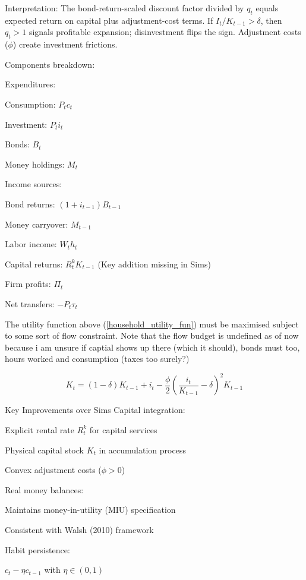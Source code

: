 \documentclass[11pt,preprint]{elsarticle}
\numberwithin{equation}{section}
\numberwithin{figure}{section}
\numberwithin{table}{section}
\begin{document}
Interpretation: The bond-return-scaled discount factor divided by
\(q_t\) equals expected return on capital plus adjustment-cost terms. If
\(I_t/K_{t-1}>\delta\), then \(q_t>1\) signals profitable expansion;
disinvestment flips the sign. Adjustment costs (\(\phi\)) create
investment frictions.

\newpage

\newpage

Components breakdown:

Expenditures:

Consumption: \(P_t c_t\)

Investment: \(P_t i_t\)

Bonds: \(B_t\)

Money holdings: \(M_t\)

Income sources:

Bond returns: \((1 + i_{t-1}) B_{t-1}\)

Money carryover: \(M_{t-1}\)

Labor income: \(W_t h_t\)

Capital returns: \(R_t^k K_{t-1}\) (Key addition missing in Sims)

Firm profits: \(\Pi_t\)

Net transfers: \(-P_t \tau_t\)

The utility function above (\ref{household_utility_fun}) must be
maximised subject to some sort of flow constraint. Note that the flow
budget is undefined as of now because i am unsure if captial shows up
there (which it should), bonds must too, hours worked and consumption
(taxes too surely?)

\begin{equation}
K_t = (1 - \delta) K_{t-1} + i_t - \frac{\phi}{2} \left( \frac{i_t}{K_{t-1}} - \delta \right)^2 K_{t-1}
\end{equation}

Key Improvements over Sims Capital integration:

Explicit rental rate \(R_t^k\) for capital services

Physical capital stock \(K_t\) in accumulation process

Convex adjustment costs (\(\phi > 0\))

Real money balances:

Maintains money-in-utility (MIU) specification

Consistent with Walsh (2010) framework

Habit persistence:

\(c_t - \eta c_{t-1}\) with \(\eta \in (0,1)\)
\end{document}
